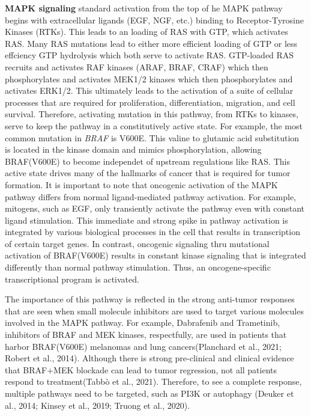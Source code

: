 \textbf{MAPK signaling} standard activation from the top of he MAPK pathway begins with extracellular ligands (EGF, NGF, etc.) binding to Receptor-Tyrosine Kinases (RTKs). This leads to an loading of RAS with GTP, which activates RAS. Many RAS mutations lead to either more efficient loading of GTP or less effciency GTP hydrolysis which both serve to activate RAS. GTP-loaded RAS recruits and activates RAF kinases (ARAF, BRAF, CRAF) which then phosphorylates and activates MEK1/2 kinases which then phosphorylates and activates ERK1/2. This ultimately leads to the activation of a suite of cellular processes that are required for proliferation, differentiation, migration, and cell survival. Therefore, activating mutation in this pathway, from RTKs to kinases, serve to keep the pathway in a constitutively active state. For example, the most common mutation in \emph{BRAF} is V600E. This valine to glutamic acid substitution is located in the kinase domain and mimics phosphorylation, allowing BRAF(V600E) to become independet of upstream regulations like RAS. This active state drives many of the hallmarks of cancer that is required for tumor formation. It is important to note that oncogenic activation of the MAPK pathway differs from normal ligand-mediated pathway activation. For example, mitogens, such as EGF, only transiently activate the pathway even with constant ligand stimulation. This immediate and strong spike in pathway activation is integrated by various biological processes in the cell that results in transcription of certain target genes. In contrast, oncogenic signaling thru mutational activation of BRAF(V600E) results in constant kinase signaling that is integrated differently than normal pathway stimulation. Thus, an oncogene-specific transcriptional program is activated.

The importance of this pathway is reflected in the strong anti-tumor responses that are seen when small molecule inhibitors are used to target various molecules involved in the MAPK pathway. For example, Dabrafenib and Trametinib, inhibitors of BRAF and MEK kinases, respectfully, are used in patients that harbor BRAF(V600E) melanomas and lung cancers(Planchard et al., 2021; Robert et al., 2014). Although there is strong pre-clinical and clinical evidence that BRAF+MEK blockade can lead to tumor regression, not all patients respond to treatment(Tabbò et al., 2021). Therefore, to see a complete response, multiple pathways need to be targeted, such as PI3K or autophagy (Deuker et al., 2014; Kinsey et al., 2019; Truong et al., 2020).

